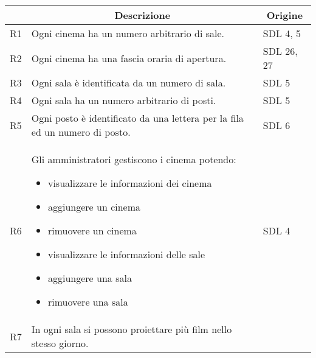 \begin{longtable}{|p{0.8cm}|p{13.4cm}|p{2.1cm}|}
      \hline
      \rowcolor{tblhdrcolor}
      \multicolumn{1}{|c|}{\textbf{Id}}                                       &
      \multicolumn{1}{|c|}{\textbf{Descrizione}}                              &
      \multicolumn{1}{|c|}{\textbf{Origine}}
      \\\hline
      R1                                                                      &
      Ogni cinema ha un numero arbitrario di sale.                            &
      SDL 4, 5
      \\\hline
      R2                                                                      &
      Ogni cinema ha una fascia oraria di apertura.                           &
      SDL 26, 27
      \\\hline
      R3                                                                      &
      Ogni sala è identificata da un numero di sala.                          &
      SDL 5
      \\\hline
      R4                                                                      &
      Ogni sala ha un numero arbitrario di posti.                             &
      SDL 5
      \\\hline
      R5                                                                      &
      Ogni posto è identificato da una lettera per la fila ed un numero
      di posto.                                                               &
      SDL 6
      \\\hline
      R6                                                                      &
      Gli amministratori gestiscono i cinema potendo:
      \begin{itemize}
            \item visualizzare le informazioni dei cinema
            \item aggiungere un cinema
            \item rimuovere un cinema
            \item visualizzare le informazioni delle sale
            \item aggiungere una sala
            \item rimuovere una sala
      \end{itemize}                           &
      SDL 4
      \\\hline
      R7                                                                      &
      In ogni sala si possono proiettare più film nello stesso giorno.        &

\end{longtable}
